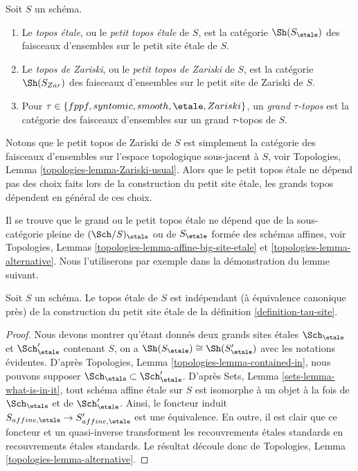 \begin{definition}
\label{definition-etale-topos}
Soit $S$ un sch\'ema.
\begin{enumerate}
\item Le {\it topos \'etale}, ou le {\it petit topos \'etale}
de $S$, est la cat\'egorie $\Sh(S_\etale)$ des faisceaux d'ensembles sur
le petit site \'etale de $S$.
\item Le {\it topos de Zariski}, ou le {\it petit topos de Zariski}
de $S$, est la cat\'egorie $\Sh(S_{Zar})$ des faisceaux d'ensembles sur le
petit site de Zariski de $S$.
\item Pour $\tau \in \{fppf, syntomic, smooth, \etale, Zariski\}$, un
{\it grand $\tau$-topos} est la cat\'egorie des faisceaux d'ensembles sur un
grand $\tau$-topos de $S$.
\end{enumerate}
\end{definition}

\noindent
Notons que le petit topos de Zariski de $S$ est simplement la cat\'egorie des faisceaux
d'ensembles sur l'espace topologique sous-jacent \`a $S$, voir
Topologies, Lemma \ref{topologies-lemma-Zariski-usual}.
Alors que le petit topos \'etale ne d\'epend pas des choix faits lors de la
construction du petit site \'etale, les grands topos d\'ependent en g\'en\'eral
de ces choix.

\medskip\noindent
Il se trouve que le grand ou le petit topos \'etale ne d\'epend que de la
sous-cat\'egorie pleine de $(\Sch/S)_\etale$ ou de $S_\etale$ form\'ee des
sch\'emas affines, voir
Topologies, Lemmas \ref{topologies-lemma-affine-big-site-etale} et
\ref{topologies-lemma-alternative}.
Nous l'utiliserons par exemple dans la d\'emonstration du lemme suivant.

\begin{lemma}
\label{lemma-etale-topos-independent-partial-universe}
Soit $S$ un sch\'ema. Le topos \'etale de $S$ est ind\'ependant
(\`a \'equivalence canonique pr\`es) de la construction du petit
site \'etale de la d\'efinition \ref{definition-tau-site}.
\end{lemma}

\begin{proof}
Nous devons montrer qu'\'etant donn\'es deux grands sites \'etales
$\Sch_\etale$ et $\Sch_\etale'$ contenant
$S$, on a $\Sh(S_\etale) \cong \Sh(S_\etale')$
avec les notations \'evidentes. D'apr\`es Topologies, Lemma \ref{topologies-lemma-contained-in},
nous pouvons supposer $\Sch_\etale \subset \Sch_\etale'$.
D'apr\`es Sets, Lemma \ref{sets-lemma-what-is-in-it},
tout sch\'ema affine \'etale sur $S$ est isomorphe \`a un objet
\`a la fois de $\Sch_\etale$ et de $\Sch_\etale'$.
Ainsi, le foncteur induit
$S_{affine, \etale} \to S_{affine, \etale}'$
est une \'equivalence. En outre, il est clair que ce foncteur
et un quasi-inverse transforment les recouvrements \'etales standards en
recouvrements \'etales standards.
Le r\'esultat d\'ecoule donc de
Topologies, Lemma \ref{topologies-lemma-alternative}.
\end{proof}





